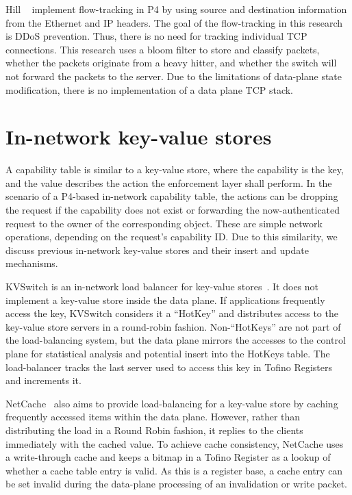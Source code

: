 Hill \etal{}~\cite{hillTrackingNetworkFlows2018} implement flow-tracking in P4 by using source and destination information from the Ethernet and \ac{IP} headers. The goal of the flow-tracking in this research is DDoS prevention. Thus, there is no need for tracking individual \ac{TCP} connections. This research uses a bloom filter to store and classify packets, whether the packets originate from a heavy hitter, and whether the switch will not forward the packets to the server.
Due to the limitations of data-plane state modification, there is no implementation of a data plane \ac{TCP} stack.
\section{In-network key-value stores}
A capability table is similar to a key-value store, where the capability is the key, and the value describes the action the enforcement layer shall perform. In the scenario of a P4-based in-network capability table, the actions can be dropping the request if the capability does not exist or forwarding the now-authenticated request to the owner of the corresponding object.
These are simple network operations, depending on the request's capability ID. Due to this similarity, we discuss previous in-network key-value stores and their insert and update mechanisms.

KVSwitch is an in-network load balancer for key-value stores~\cite{shiKVSwitchInnetworkLoad2019}\@. It does not implement a key-value store inside the data plane. If applications frequently access the key, KVSwitch considers it a \enquote{HotKey} and distributes access to the key-value store servers in a round-robin fashion. Non-\enquote{HotKeys} are not part of the load-balancing system, but the data plane mirrors the accesses to the control plane for statistical analysis and potential insert into the HotKeys table. The load-balancer tracks the last server used to access this key in Tofino Registers and increments it.

NetCache~\cite{jinNetCacheBalancingKeyValue2017} also aims to provide load-balancing for a key-value store by caching frequently accessed items within the data plane. However, rather than distributing the load in a Round Robin fashion, it replies to the clients immediately with the cached value. To achieve cache consistency, NetCache uses a write-through cache and keeps a bitmap in a Tofino Register as a lookup of whether a cache table entry is valid. As this is a register base, a cache entry can be set invalid during the data-plane processing of an invalidation or write packet.
